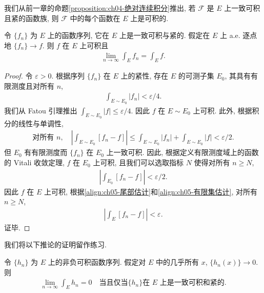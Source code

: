 \documentclass[../../main.tex]{subfiles}
\begin{document}
我们从前一章的命题\cref{proposition:ch04-绝对连续积分}推出, 若 $\mathcal{F}$ 是 $E$ 上一致可积且紧的函数族, 则 $\mathcal{F}$ 中的每个函数在 $E$ 上是可积的.

\begin{theorem}\label{theorem:ch05-一般Vitali}
令 $\{f_{n}\}$ 为 $E$ 上的函数序列, 它在 $E$ 上是一致可积与紧的. 假定在 $E$ 上 a.e. 逐点地 $\{f_{n}\}\to f$. 则 $f$ 在 $E$ 上可积且
\begin{align*}
\lim_{n\to\infty}\int_{E}f_{n}=\int_{E}f.
\end{align*}
\end{theorem}

\begin{proof}
令 $\varepsilon>0$. 根据序列 $\{f_{n}\}$ 在 $E$ 上的紧性, 存在 $E$ 的可测子集 $E_{0}$, 其具有有限测度且对所有 $n$,
\begin{align*}
\int_{E\sim E_{0}}|f_{n}|<\varepsilon/4.
\end{align*}
我们从 Fatou 引理推出 $\int_{E\sim E_{0}}|f|\leqslant\varepsilon/4$. 因此 $f$ 在 $E\sim E_{0}$ 上可积. 此外, 根据积分的线性与单调性,
\begin{align}
\text{对所有 }n,\quad\left|\int_{E\sim E_{0}}[f_{n}-f]\right|\leqslant\int_{E\sim E_{0}}|f_{n}|+\int_{E\sim E_{0}}|f|<\varepsilon/2.\label{align:ch05-尾部估计}
\end{align}
但 $E_{0}$ 有有限测度而 $\{f_{n}\}$ 在 $E_{0}$ 上一致可积. 因此, 根据定义有限测度域上的函数的 Vitali 收敛定理, $f$ 在 $E_{0}$ 上可积, 且我们可以选取指标 $N$ 使得对所有 $n\geqslant N$,
\begin{align}
\left|\int_{E_{0}}[f_{n}-f]\right|<\varepsilon/2.\label{align:ch05-有限集估计}
\end{align}
因此 $f$ 在 $E$ 上可积, 根据\eqref{align:ch05-尾部估计}和\eqref{align:ch05-有限集估计}, 对所有 $n\geqslant N$,
\begin{align*}
\left|\int_{E}[f_{n}-f]\right|<\varepsilon.
\end{align*}
证毕.
\end{proof}

我们将以下推论的证明留作练习.

\begin{corollary}\label{corollary:ch05-非负收敛}
令 $\{h_{n}\}$ 为 $E$ 上的非负可积函数序列. 假定对 $E$ 中的几乎所有 $x$, $\{h_{n}(x)\}\to 0$. 则
\begin{align*}
\lim_{n\to\infty}\int_{E}h_{n}=0\quad\text{当且仅当}\{h_{n}\}\text{在 }E\text{ 上是一致可积和紧的}.
\end{align*}
\end{corollary}
\end{document}
